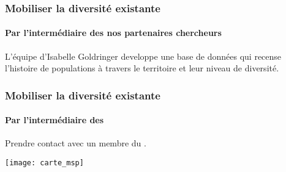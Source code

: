 \begin{frame}
\frametitle{Mobiliser la diversité existante}
\framesubtitle{Par l'intermédiaire des nos partenaires chercheurs}

L'équipe d'Isabelle Goldringer developpe une base de données qui recense l'histoire de populations à travers le territoire et leur niveau de diversité.

\end{frame}


\begin{frame}
\frametitle{Mobiliser la diversité existante}
\framesubtitle{Par l'intermédiaire des \MSPs}

Prendre contact avec un membre du \RSP.

\begin{center}
\texttt{[image: carte\_msp]}
\end{center}


\end{frame}



